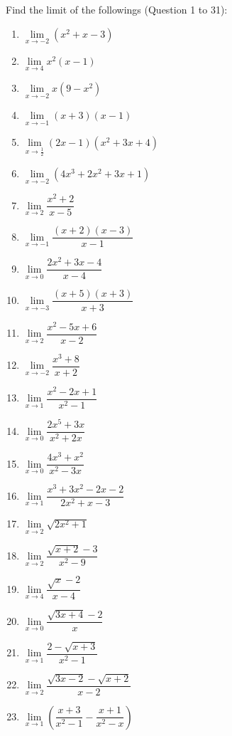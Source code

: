 \documentclass[12pt]{report}
\begin{document}
\setlength{\columnseprule}{1pt}
\setlength{\columnsep}{24pt}
\begin{multicols}{2}
    Find the limit of the followings (Question 1 to 31):

    \begin{enumerate}
        \item $\lim\limits_{x\to-2}\left(x^{2}+x-3\right)$
        \item $\lim\limits_{x\to4}x^{2}(x-1)$
        \item $\lim\limits_{x\to-2}x\left(9-x^{2}\right)$
        \item $\lim\limits_{x\to-1}(x+3)\left(x-1\right)$
        \item $\lim\limits_{x\to{\frac{1}{2}}}\left(2x-1\right)\left(x^{2}+3x+4\right)$
        \item $\lim\limits_{x\to-2}\left(4x^{3}+2x^{2}+3x+1\right)$
        \item $\lim\limits_{x\to2}{\dfrac{x^{2}+2}{x-5}}$
        \item $\lim\limits_{x\to-1}{\dfrac{(x+2)(x-3)}{x-1}}$
        \item $\lim\limits_{x\to0}{\dfrac{2x^{2}+3x-4}{x-4}}$
        \item $\lim\limits_{x\to-3}\dfrac{(x+5)(x+3)}{x+3}$
        \item $\lim\limits_{x\to2}{\dfrac{x^{2}-5x+6}{x-2}}$
        \item $\lim\limits_{x\to-2}{\dfrac{x^{3}+8}{x+2}}$
        \item $\lim\limits_{x\to1}{\dfrac{x^{2}-2x+1}{x^{2}-1}}$
        \item $\lim\limits_{x\to0}{\dfrac{2x^{5}+3x}{x^{2}+2x}}$
        \item $\lim\limits_{x\to0}{\dfrac{4x^{3}+x^{2}}{x^{2}-3x}}$
        \item $\lim\limits_{x\to1}{\dfrac{x^{3}+3x^{2}-2x-2}{2x^{2}+x-3}}$
        \item $\lim\limits_{x\to2}{\sqrt{2x^{2}+1}}$
        \item $\lim\limits_{x\to2}{\dfrac{{\sqrt{x+2}}-3}{x^{2}-9}}$
        \item $\lim\limits_{x\to4}{\dfrac{{\sqrt{x}}-2}{x-4}}$
        \item $\lim\limits_{x\to0}{\dfrac{\sqrt{3x+4}-2}{x}}$
        \item $\lim\limits_{x\to1}{\dfrac{2-{\sqrt{x+3}}}{x^{2}-1}}$
        \item $\lim\limits_{x\to2}{\dfrac{{\sqrt{3x-2}}-{\sqrt{x+2}}}{x-2}}$
        \item $\lim\limits_{x\to1}\left({\dfrac{x+3}{x^{2}-1}}-{\dfrac{x+1}{x^{2}-x}}\right)$

\end{enumerate}
\end{multicols}
\end{document}
